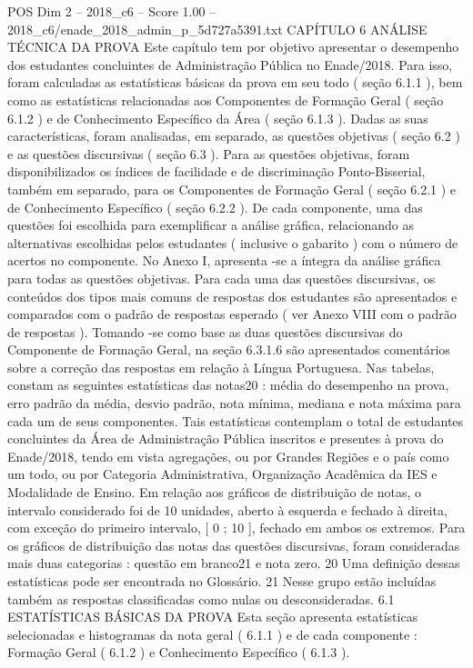 \begin{textsample}{POS Dim 2 – 2018\_c6 – Score 1.00 – 2018\_c6/enade\_2018\_admin\_p\_5d727a5391.txt}  \label{ex:f2_pos_197}
CAPÍTULO 6 ANÁLISE TÉCNICA DA PROVA Este capítulo tem por objetivo apresentar o desempenho dos estudantes concluintes de Administração Pública no Enade/2018.
Para isso, foram calculadas as estatísticas básicas da prova em seu todo ( seção 6.1.1 ), bem como as estatísticas relacionadas aos Componentes de Formação Geral ( seção 6.1.2 ) e de Conhecimento Específico da Área ( seção 6.1.3 ).
Dadas as suas características, foram analisadas, em separado, as questões objetivas ( seção 6.2 ) e as questões discursivas ( seção 6.3 ).
Para as questões objetivas, foram disponibilizados os índices de facilidade e de discriminação Ponto-Bisserial, também em separado, para os Componentes de Formação Geral ( seção 6.2.1 ) e de Conhecimento Específico ( seção 6.2.2 ).
De cada componente, uma das questões foi escolhida para exemplificar a análise gráfica, relacionando as alternativas escolhidas pelos estudantes ( inclusive o gabarito ) com o número de acertos no componente.
No Anexo I, apresenta -se a íntegra da análise gráfica para todas as questões objetivas.
Para cada uma das questões discursivas, os conteúdos dos tipos mais comuns de respostas dos estudantes são apresentados e comparados com o padrão de respostas esperado ( ver Anexo VIII com o padrão de respostas ).
Tomando -se como base as duas questões discursivas do Componente de Formação Geral, na seção 6.3.1.6 são apresentados comentários sobre a correção das respostas em relação à Língua Portuguesa.
Nas tabelas, constam as seguintes estatísticas das notas20 : média do desempenho na prova, erro padrão da média, desvio padrão, nota mínima, mediana e nota máxima para cada um de seus componentes.
Tais estatísticas contemplam o total de estudantes concluintes da Área de Administração Pública inscritos e presentes à prova do Enade/2018, tendo em vista agregações, ou por Grandes Regiões e o país como um todo, ou por Categoria Administrativa, Organização Acadêmica da IES e Modalidade de Ensino.
Em relação aos gráficos de distribuição de notas, o intervalo considerado foi de 10 unidades, aberto à esquerda e fechado à direita, com exceção do primeiro intervalo, [ 0 ; 10 ], fechado em ambos os extremos.
Para os gráficos de distribuição das notas das questões discursivas, foram consideradas mais duas categorias : questão em branco21 e nota zero. 20 Uma definição dessas estatísticas pode ser encontrada no Glossário. 21 Nesse grupo estão incluídas também as respostas classificadas como nulas ou desconsideradas. 6.1 ESTATÍSTICAS BÁSICAS DA PROVA Esta seção apresenta estatísticas selecionadas e histogramas da nota geral ( 6.1.1 ) e de cada componente : Formação Geral ( 6.1.2 ) e Conhecimento Específico ( 6.1.3 ).

\end{textsample}
